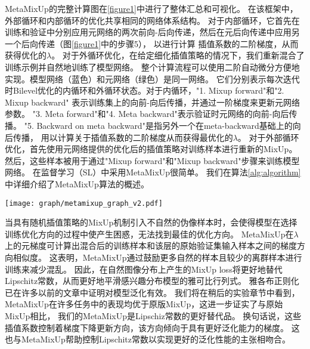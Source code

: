 \documentclass[promaster]{thesis-uestc}
\begin{document}
MetaMixUp的完整计算图在\ref{figure1}中进行了整体汇总和可视化。 
在该框架中，外部循环和内部循环的优化共享相同的网络体系结构。 
对于内部循环，它首先在训练和验证中分别应用元网络的两次前向-后向传递，然后在元后向传递中应用另一个后向传递（图\ref{figure1}中的步骤5），
以进行计算 插值系数的二阶梯度，从而获得优化的$\lambda $。 
对于外循环优化，在给定细化插值策略的情况下，我们重新混合了训练示例并自然地训练了模型网络。 
整个计算流程可以使用二阶自动微分方便地实现。模型网络（蓝色）和元网络（绿色）是同一网络。
它们分别表示每次迭代时Bilevel优化的内循环和外循环状态。对于内循环，"1. Mixup forward"和"2. Mixup backward"
表示训练集上的向前-向后传播，并通过一阶梯度来更新元网络参数。
"3. Meta forward"和"4. Meta backward"表示验证时元网络的向前-向后传播。 
"5. Backward on meta backward"是指另外一个在meta-backward基础上的向后传播，
用以计算关于插值系数的二阶梯度从而获得最优化的$\lambda $。
对于外部循环优化，首先使用元网络提供的优化后的插值策略对训练样本进行重新的MixUp。
然后，这些样本被用于通过"Mixup forward"和"Mixup backward"步骤来训练模型网络。
在监督学习（SL）中采用MetaMixUp很简单。 我们在算法\ref{alg:algorithm}中详细介绍了MetaMixUp算法的概述。

\begin{figure*}[htp!]
	\centering  
	\texttt{[image: graph/metamixup\_graph\_v2.pdf]}
    \caption{我们的MetaMixUp在深度神经网络中的计算图。}
	\label{figure1}
\end{figure*}



当具有随机插值策略的MixUp机制引入不自然的伪像样本时，会使得模型在选择训练优化方向的过程中使产生困惑，无法找到最佳的优化方向。
MetaMixUp在$ \lambda $上的元梯度可计算出混合后的训练样本和该层的原始验证集输入样本之间的梯度方向相似度。
这表明，MetaMixUp通过鼓励更多自然的样本且较少的离群样本进行训练来减少混乱。
因此，在自然图像分布上产生的MixUp loss将更好地替代Lipschitz常数，从而更好地平滑感兴趣分布模型的雅可比行列式。
雅各布正则化已在许多以前的文章中证明对模型泛化有效\cite{cisse2017parseval}\cite{Dropouttrain}。
我们将在稍后的实验章节中看到，MetaMixUp在许多任务中的表现均优于原版MixUp，这进一步证实了与原始MixUp相比，
我们的MetaMixUp是Lipschiz常数的更好替代品。
换句话说，这些插值系数控制着梯度下降更新方向，该方向倾向于具有更好泛化能力的梯度。
这也与MetaMixUp帮助控制Lipschitz常数以实现更好的泛化性能的主张相吻合。
\end{document}
